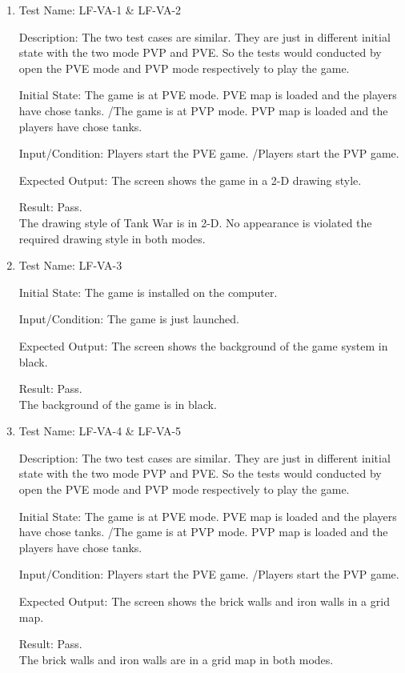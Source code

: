 \documentclass[12pt, titlepage]{article}
\begin{document}
\begin{enumerate}

\item{Test Name: LF-VA-1 \& LF-VA-2\\}

Description: The two test cases are similar. They are just in different initial state with the two mode PVP and PVE. So the tests would conducted by open the PVE mode and PVP mode respectively to play the game.

Initial State: The game is at PVE mode. PVE map is loaded and the players have chose tanks. /The game is at PVP mode. PVP map is loaded and the players have chose tanks.

Input/Condition: Players start the PVE game. /Players start the PVP game.

Expected Output: The screen shows the game in a 2-D drawing style.

Result: Pass. \\The drawing style of Tank War is in 2-D. No appearance is violated the required drawing style in both modes.

\item{Test Name: LF-VA-3\\}

Initial State: The game is installed on the computer.

Input/Condition: The game is just launched.

Expected Output: The screen shows the background of the game system in black.

Result: Pass. \\The background of the game is in black.

\item{Test Name: LF-VA-4 \& LF-VA-5\\}

Description: The two test cases are similar. They are just in different initial state with the two mode PVP and PVE. So the tests would conducted by open the PVE mode and PVP mode respectively to play the game.

Initial State: The game is at PVE mode. PVE map is loaded and the players have chose tanks. /The game is at PVP mode. PVP map is loaded and the players have chose tanks.

Input/Condition: Players start the PVE game. /Players start the PVP game.

Expected Output: The screen shows the brick walls and iron walls in a grid map.

Result: Pass. \\The brick walls and iron walls are in a grid map in both modes.


\end{enumerate}
\end{document}
